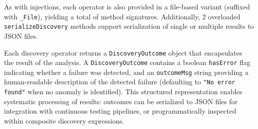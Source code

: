 As with injections, each operator is also provided in a file-based variant (suffixed with \texttt{\_File}), yielding a total of  method signatures. Additionally, 2 overloaded \texttt{serializeDiscovery} methods support serialization of single or multiple results to JSON files.

Each discovery operator returns a \texttt{DiscoveryOutcome} object that encapsulates the result of the analysis. A \texttt{DiscoveryOutcome} contains a boolean \texttt{hasError} flag indicating whether a failure was detected, and an \texttt{outcomeMsg} string providing a human-readable description of the detected failure (defaulting to \texttt{"No error found"} when no anomaly is identified). This structured representation enables systematic processing of results: outcomes can be serialized to JSON files for integration with continuous testing pipelines, or programmatically inspected within composite discovery expressions.













